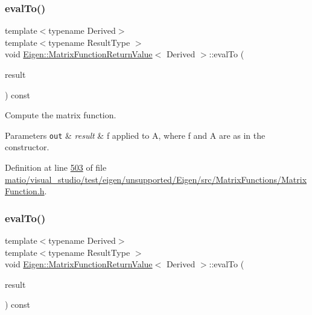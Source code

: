 \subsubsection{\texorpdfstring{eval\+To()}{evalTo()}\hspace{0.1cm}{\footnotesize\ttfamily [1/2]}}
{\footnotesize\ttfamily template$<$typename Derived$>$ \\
template$<$typename Result\+Type $>$ \\
void \hyperlink{class_eigen_1_1_matrix_function_return_value}{Eigen\+::\+Matrix\+Function\+Return\+Value}$<$ Derived $>$\+::eval\+To (\begin{DoxyParamCaption}\item[{Result\+Type \&}]{result }\end{DoxyParamCaption}) const\hspace{0.3cm}{\ttfamily [inline]}}



Compute the matrix function. 


\begin{DoxyParams}[1]{Parameters}
\mbox{\tt out}  & {\em result} & {\ttfamily f} applied to {\ttfamily A}, where {\ttfamily f} and {\ttfamily A} are as in the constructor. \\
\hline
\end{DoxyParams}


Definition at line \hyperlink{matio_2visual__studio_2test_2eigen_2unsupported_2_eigen_2src_2_matrix_functions_2_matrix_function_8h_source_l00503}{503} of file \hyperlink{matio_2visual__studio_2test_2eigen_2unsupported_2_eigen_2src_2_matrix_functions_2_matrix_function_8h_source}{matio/visual\+\_\+studio/test/eigen/unsupported/\+Eigen/src/\+Matrix\+Functions/\+Matrix\+Function.\+h}.

\mbox{\label{class_eigen_1_1_matrix_function_return_value_a202d594ae254e3ea5420ff95d9f03a67}} 
\subsubsection{\texorpdfstring{eval\+To()}{evalTo()}\hspace{0.1cm}{\footnotesize\ttfamily [2/2]}}
{\footnotesize\ttfamily template$<$typename Derived$>$ \\
template$<$typename Result\+Type $>$ \\
void \hyperlink{class_eigen_1_1_matrix_function_return_value}{Eigen\+::\+Matrix\+Function\+Return\+Value}$<$ Derived $>$\+::eval\+To (\begin{DoxyParamCaption}\item[{Result\+Type \&}]{result }\end{DoxyParamCaption}) const\hspace{0.3cm}{\ttfamily [inline]}}



